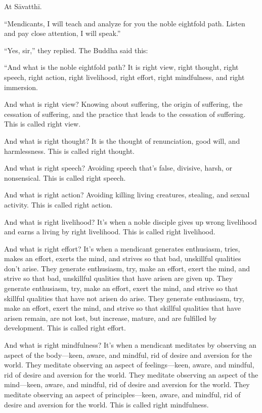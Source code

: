 \documentclass[12pt,openany]{book}%
\begin{document}
At \textsanskrit{Sāvatthī}. 

“Mendicants, I will teach and analyze for you the noble eightfold path. Listen and pay close attention, I will speak.” 

“Yes, sir,” they replied. The Buddha said this: 

“And what is the noble eightfold path? It is right view, right thought, right speech, right action, right livelihood, right effort, right mindfulness, and right immersion. 

And what is right view? Knowing about suffering, the origin of suffering, the cessation of suffering, and the practice that leads to the cessation of suffering. This is called right view. 

And what is right thought? It is the thought of renunciation, good will, and harmlessness. This is called right thought. 

And what is right speech? Avoiding speech that’s false, divisive, harsh, or nonsensical. This is called right speech. 

And what is right action? Avoiding killing living creatures, stealing, and sexual activity. This is called right action. 

And what is right livelihood? It’s when a noble disciple gives up wrong livelihood and earns a living by right livelihood. This is called right livelihood. 

And what is right effort? It’s when a mendicant generates enthusiasm, tries, makes an effort, exerts the mind, and strives so that bad, unskillful qualities don’t arise. They generate enthusiasm, try, make an effort, exert the mind, and strive so that bad, unskillful qualities that have arisen are given up. They generate enthusiasm, try, make an effort, exert the mind, and strive so that skillful qualities that have not arisen do arise. They generate enthusiasm, try, make an effort, exert the mind, and strive so that skillful qualities that have arisen remain, are not lost, but increase, mature, and are fulfilled by development. This is called right effort. 

And what is right mindfulness? It’s when a mendicant meditates by observing an aspect of the body—keen, aware, and mindful, rid of desire and aversion for the world. They meditate observing an aspect of feelings—keen, aware, and mindful, rid of desire and aversion for the world. They meditate observing an aspect of the mind—keen, aware, and mindful, rid of desire and aversion for the world. They meditate observing an aspect of principles—keen, aware, and mindful, rid of desire and aversion for the world. This is called right mindfulness. 
\end{document}
